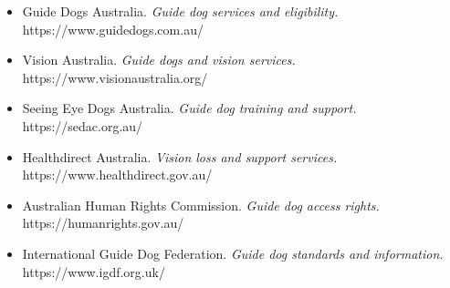 \begin{itemize}
    \item Guide Dogs Australia. \textit{Guide dog services and eligibility.} https://www.guidedogs.com.au/
    \item Vision Australia. \textit{Guide dogs and vision services.} https://www.visionaustralia.org/
    \item Seeing Eye Dogs Australia. \textit{Guide dog training and support.} https://sedac.org.au/
    \item Healthdirect Australia. \textit{Vision loss and support services.} https://www.healthdirect.gov.au/
    \item Australian Human Rights Commission. \textit{Guide dog access rights.} https://humanrights.gov.au/
    \item International Guide Dog Federation. \textit{Guide dog standards and information.} https://www.igdf.org.uk/
\end{itemize}

